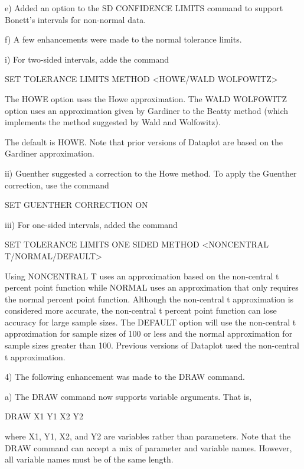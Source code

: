     e) Added an option to the SD CONFIDENCE LIMITS command to
       support Bonett's intervals for non-normal data.

    f) A few enhancements were made to the normal tolerance limits.

          i) For two-sided intervals, adde the command

                SET TOLERANCE LIMITS METHOD <HOWE/WALD WOLFOWITZ>

             The HOWE option uses the Howe approximation.  The
             WALD WOLFOWITZ option uses an approximation given
             by Gardiner to the Beatty method (which implements
             the method suggested by Wald and Wolfowitz).

             The default is HOWE.  Note that prior versions of
             Dataplot are based on the Gardiner approximation.

         ii) Guenther suggested a correction to the Howe method.
             To apply the Guenther correction, use the command

                SET GUENTHER CORRECTION ON

        iii) For one-sided intervals, added the command

                SET TOLERANCE LIMITS ONE SIDED METHOD
                    <NONCENTRAL T/NORMAL/DEFAULT>

             Using NONCENTRAL T uses an approximation based on the
             non-central t percent point function while NORMAL uses an
             approximation that only requires the normal percent point
             function.  Although the non-central t approximation is
             considered more accurate, the non-central t percent point
             function can lose accuracy for large sample sizes.  The
             DEFAULT option will use the non-central t approximation
             for sample sizes of 100 or less and the normal approximation
             for sample sizes greater than 100.  Previous versions of
             Dataplot used the non-central t approximation.

 4) The following enhancement was made to the DRAW command.

    a) The DRAW command now supports variable arguments.  That is,

           DRAW X1 Y1 X2 Y2

       where X1, Y1, X2, and Y2 are variables rather than parameters.
       Note that the DRAW command can accept a mix of parameter and
       variable names.  However, all variable names must be of the same
       length.

